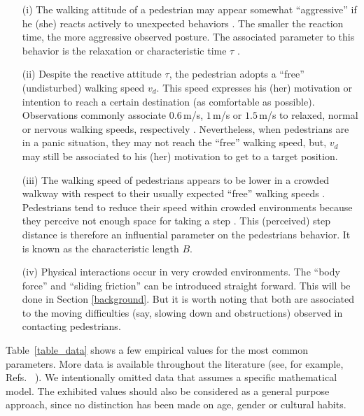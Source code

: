 \documentclass[preprint,12pt]{elsarticle}
\begin{document}
\begin{itemize} \item[(i)] The walking attitude of a pedestrian may appear
somewhat    ``aggressive'' if he (she) reacts actively to unexpected behaviors
\cite{lakoba_2005,helbing_1995}. The smaller the reaction time, the more
aggressive observed posture. The associated parameter to this  behavior is the
relaxation or characteristic time $\tau$  \cite{johansson_2009,helbing_2000}.

\item[(ii)] Despite the reactive attitude $\tau$, the pedestrian adopts a
``free'' (undisturbed) walking speed $v_d$. This speed expresses his (her)
motivation or intention to reach a certain destination (as comfortable as
possible). Observations commonly associate $0.6\,$m/s, $1\,$m/s or $1.5\,$m/s
to relaxed, normal or nervous walking speeds, respectively
\cite{helbing_1995,helbing_2000,li_2015}.  Nevertheless, when pedestrians are in
a panic situation,  they may not reach the ``free'' walking speed, but, $v_d$
may still be   associated to his (her) motivation to get to a target position.

\item[(iii)] The walking speed of pedestrians appears to be lower in a  crowded
walkway with respect to their usually expected ``free'' walking speeds
\cite{weidmann_1992,lakoba_2005}. Pedestrians tend to reduce their speed within
crowded environments because they perceive not enough space for taking a  step
\cite{johansson_2009}. This (perceived) step distance  is therefore an
influential parameter on the pedestrians behavior.  It is known as the
characteristic length $B$.

\item[(iv)] Physical interactions occur in very crowded environments. The
``body force''  and ``sliding friction'' can be introduced straight forward.
This will be done in Section \ref{background}. But it is worth noting that  both
are associated to the moving difficulties (say, slowing down and  obstructions)
observed in contacting pedestrians.

\end{itemize}


Table~\ref{table_data} shows a few empirical values  for the most common
parameters. More data is available throughout the literature (see, for example,
Refs.~\cite{hoogendoorn_2007,seyfried_2007,johansson_2007,moussaid_2009,
luber_2010,seer_2014,li_2015} ). We intentionally omitted data that assumes a
specific mathematical model. The exhibited values should also be considered as a
general purpose approach, since no distinction has been made on age, gender or
cultural habits. \\
\end{document}
